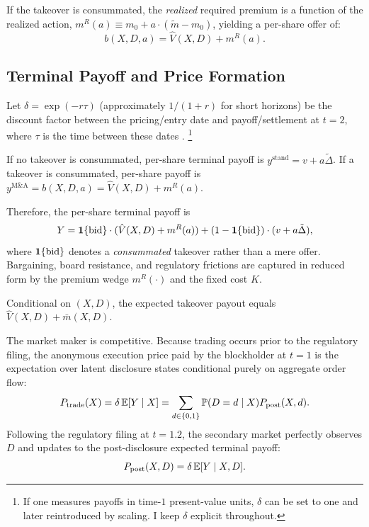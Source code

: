 \documentclass[11pt]{article}
\newcommand{\E}{\mathbb{E}}
\newcommand{\PP}{\mathbb{P}}
\newcommand{\1}{\mathbf{1}}
\begin{document}
If the takeover is consummated, the \emph{realized} required premium is a function of the realized action, $m^{R}(a) \equiv m_0 + a\cdot(\tilde{m}-m_0)$, yielding a per-share offer of:
\[
b(X,D,a) = \hat{V}(X,D) + m^{R}(a).
\]

%
\subsection{Terminal Payoff and Price Formation}
%

Let $\delta = \exp(-r\tau)$ (approximately $1/(1+r)$ for short horizons) be the discount factor between the pricing/entry date and payoff/settlement at $t=2$, where $\tau$ is the time between these dates \citep{Cochrane2005,Duffie2010}.%
\footnote{If one measures payoffs in time-$1$ present-value units, $\delta$ can be set to one and later reintroduced by scaling. I keep $\delta$ explicit throughout.}

If no takeover is consummated, per-share terminal payoff is $y^{\text{stand}} = v + a\tilde{\Delta}$. If a takeover is consummated, per-share payoff is $y^{\text{M\&A}} = b(X,D,a) = \hat{V}(X,D) + m^{R}(a)$.

Therefore, the per-share terminal payoff is
\[
Y = \1\{\textup{bid}\} \cdot (\hat{V}(X,D) + m^{R}(a)) + (1 - \1\{\textup{bid}\}) \cdot (v + a\tilde{\Delta}),
\]
where $\1\{\textup{bid}\}$ denotes a \emph{consummated} takeover rather than a mere offer. Bargaining, board resistance, and regulatory frictions are captured in reduced form by the premium wedge $m^{R}(\cdot)$ and the fixed cost $K$.

Conditional on $(X,D)$, the expected takeover payout equals $\hat{V}(X,D)+\bar{m}(X,D)$.

The market maker is competitive. Because trading occurs prior to the regulatory filing, the anonymous execution price paid by the blockholder at $t=1$ is the expectation over latent disclosure states conditional purely on aggregate order flow:
\begin{equation}
P_{\textup{trade}}(X) = \delta \, \E[Y \mid X] = \sum_{d \in \{0,1\}} \PP(D=d \mid X) P_{\textup{post}}(X,d).
\label{eq:pricing_trade}
\end{equation}
Following the regulatory filing at $t=1.2$, the secondary market perfectly observes $D$ and updates to the post-disclosure expected terminal payoff:
\begin{equation}
P_{\textup{post}}(X,D) = \delta \, \E[Y \mid X, D].
\label{eq:pricing_post}
\end{equation}
\end{document}
